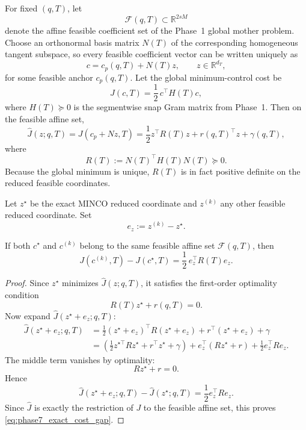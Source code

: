 For fixed \((q,T)\), let
\[
\mathcal F(q,T)\subset \mathbb R^{2sM}
\]
denote the affine feasible coefficient set of the Phase~1 global mother problem.
Choose an orthonormal basis matrix \(N(T)\) of the corresponding homogeneous tangent subspace, so every feasible coefficient vector can be written uniquely as
\begin{equation}
	\label{eq:phase7_feasible_param}
	c=c_p(q,T)+N(T)z,
	\qquad
	z\in\mathbb R^{d_T},
\end{equation}
for some feasible anchor \(c_p(q,T)\).
Let the global minimum-control cost be
\begin{equation}
	\label{eq:phase7_global_cost}
	J(c,T)=\frac12\,c^\top H(T)c,
\end{equation}
where \(H(T)\succeq 0\) is the segmentwise snap Gram matrix from Phase~1.
Then on the feasible affine set,
\begin{equation}
	\label{eq:phase7_reduced_cost}
	\widehat J(z;q,T)
	=
	J(c_p+Nz,T)
	=
	\frac12 z^\top R(T) z + r(q,T)^\top z + \gamma(q,T),
\end{equation}
where
\begin{equation}
	\label{eq:phase7_reduced_H}
	R(T):=N(T)^\top H(T)N(T)\succeq 0.
\end{equation}
Because the global minimum is unique, \(R(T)\) is in fact positive definite on the reduced feasible coordinates.

Let \(z^\star\) be the exact MINCO reduced coordinate and \(z^{(k)}\) any other feasible reduced coordinate.
Set
\[
e_z:=z^{(k)}-z^\star.
\]

\begin{lemma}
	\label{lem:phase7_exact_cost_gap}
	If both \(c^\star\) and \(c^{(k)}\) belong to the same feasible affine set \(\mathcal F(q,T)\), then
	\begin{equation}
		\label{eq:phase7_exact_cost_gap}
		J(c^{(k)},T)-J(c^\star,T)
		=
		\frac12\, e_z^\top R(T)e_z.
	\end{equation}
\end{lemma}

\begin{proof}
	Since \(z^\star\) minimizes \(\widehat J(z;q,T)\), it satisfies the first-order optimality condition
	\[
	R(T)z^\star + r(q,T)=0.
	\]
	Now expand \(\widehat J(z^\star+e_z;q,T)\):
	\begin{align*}
		\widehat J(z^\star+e_z;q,T)
		&=
		\frac12(z^\star+e_z)^\top R(z^\star+e_z)
		+
		r^\top(z^\star+e_z)
		+
		\gamma \\
		&=
		\left(\frac12 z^{\star\top}Rz^\star+r^\top z^\star+\gamma\right)
		+
		e_z^\top(Rz^\star+r)
		+
		\frac12 e_z^\top R e_z.
	\end{align*}
	The middle term vanishes by optimality:
	\[
	Rz^\star+r=0.
	\]
	Hence
	\[
	\widehat J(z^\star+e_z;q,T)-\widehat J(z^\star;q,T)
	=
	\frac12 e_z^\top R e_z.
	\]
	Since \(\widehat J\) is exactly the restriction of \(J\) to the feasible affine set, this proves \eqref{eq:phase7_exact_cost_gap}.
\end{proof}

